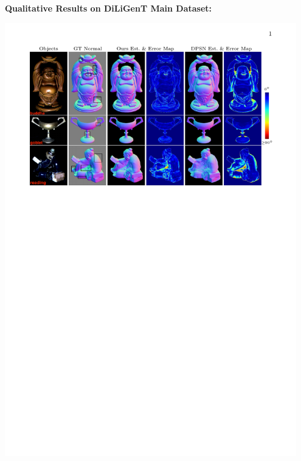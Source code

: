 \documentclass[portrait,a0paper,fontscale=0.292]{baposter}
\begin{document}
\begin{poster}
{    \hfill
    \begin{minipage}[t]{0.465\textwidth}
    \textbf{\color{blue}Qualitative Results on DiLiGenT Main Dataset:}
        \begin{center}
            \vspace{-0.5em}
            \includegraphics[width=0.95\textwidth]{images/res_qual_diligent_main}
        \end{center}
    \end{minipage}

}
\end{poster}
\end{document}
